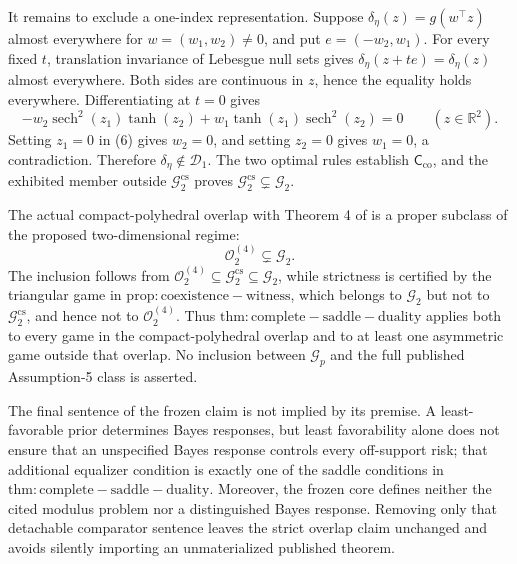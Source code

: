 It remains to exclude a one-index representation. Suppose
\(\delta_{\eta}(z)=g(w^{\top}z)\) almost everywhere for \(w=(w_1,w_2)\neq0\), and put \(e=(-w_2,w_1)\). For every fixed \(t\), translation invariance of Lebesgue null sets gives
\(\delta_{\eta}(z+te)=\delta_{\eta}(z)\) almost everywhere. Both sides are continuous in \(z\), hence the equality holds everywhere. Differentiating at \(t=0\) gives
\[
 -w_2\operatorname{sech}^2(z_1)\tanh(z_2)
 +w_1\tanh(z_1)\operatorname{sech}^2(z_2)=0
 \qquad(z\in\mathbb R^2). \tag{6}
\]
Setting \(z_1=0\) in (6) gives \(w_2=0\), and setting \(z_2=0\) gives \(w_1=0\), a contradiction. Therefore \(\delta_{\eta}\notin\mathcal D_1\). The two optimal rules establish \(\mathsf C_{\mathrm{co}}\), and the exhibited member outside \(\mathcal G_2^{\mathrm{cs}}\) proves \(\mathcal G_2^{\mathrm{cs}}\subsetneq\mathcal G_2\).

The actual compact-polyhedral overlap with Theorem 4 of \cite{MontielOleaQiuStoye2026Local} is a proper subclass of the proposed two-dimensional regime:
\[
\mathcal O_2^{(4)}\subsetneq\mathcal G_2.
\]
The inclusion follows from \(\mathcal O_2^{(4)}\subseteq\mathcal G_2^{\mathrm{cs}}\subseteq\mathcal G_2\), while strictness is certified by the triangular game in \(\mathrm{prop:coexistence-witness}\), which belongs to \(\mathcal G_2\) but not to \(\mathcal G_2^{\mathrm{cs}}\), and hence not to \(\mathcal O_2^{(4)}\). Thus \(\mathrm{thm:complete-saddle-duality}\) applies both to every game in the compact-polyhedral overlap and to at least one asymmetric game outside that overlap. No inclusion between \(\mathcal G_p\) and the full published Assumption-5 class is asserted.

The final sentence of the frozen claim is not implied by its premise. A least-favorable prior determines Bayes responses, but least favorability alone does not ensure that an unspecified Bayes response controls every off-support risk; that additional equalizer condition is exactly one of the saddle conditions in \(\mathrm{thm:complete-saddle-duality}\). Moreover, the frozen core defines neither the cited modulus problem nor a distinguished Bayes response. Removing only that detachable comparator sentence leaves the strict overlap claim unchanged and avoids silently importing an unmaterialized published theorem.

